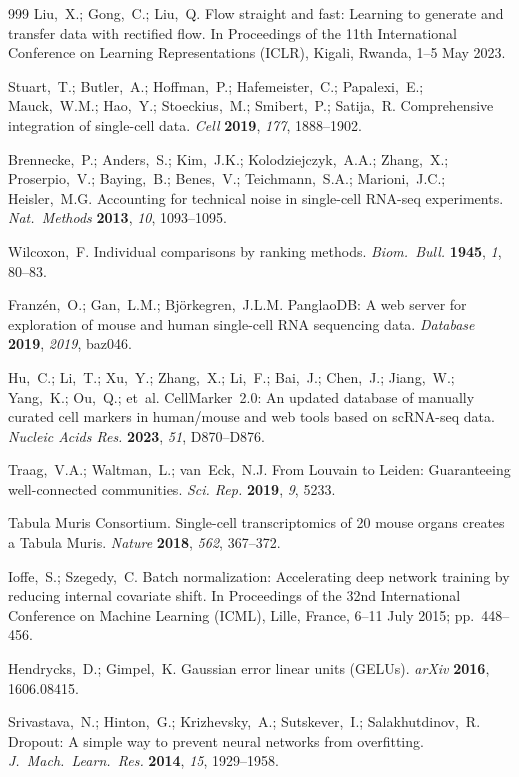 \documentclass[preprint,12pt]{elsarticle}
\begin{document}
\begin{thebibliography}{999}
Liu,~X.; Gong,~C.; Liu,~Q. Flow straight and fast: Learning to generate and transfer data with rectified flow. In Proceedings of the 11th International Conference on Learning Representations (ICLR), Kigali, Rwanda, 1--5 May 2023.

Stuart,~T.; Butler,~A.; Hoffman,~P.; Hafemeister,~C.; Papalexi,~E.; Mauck,~W.M.; Hao,~Y.; Stoeckius,~M.; Smibert,~P.; Satija,~R. Comprehensive integration of single-cell data. {\em Cell} {\bf 2019}, {\em 177}, 1888--1902.

Brennecke,~P.; Anders,~S.; Kim,~J.K.; Kolodziejczyk,~A.A.; Zhang,~X.; Proserpio,~V.; Baying,~B.; Benes,~V.; Teichmann,~S.A.; Marioni,~J.C.; Heisler,~M.G. Accounting for technical noise in single-cell RNA-seq experiments. {\em Nat.\ Methods} {\bf 2013}, {\em 10}, 1093--1095.

Wilcoxon,~F. Individual comparisons by ranking methods. {\em Biom.\ Bull.} {\bf 1945}, {\em 1}, 80--83.

Franz\'{e}n,~O.; Gan,~L.M.; Bj\"{o}rkegren,~J.L.M. PanglaoDB: A web server for exploration of mouse and human single-cell RNA sequencing data. {\em Database} {\bf 2019}, {\em 2019}, baz046.

Hu,~C.; Li,~T.; Xu,~Y.; Zhang,~X.; Li,~F.; Bai,~J.; Chen,~J.; Jiang,~W.; Yang,~K.; Ou,~Q.; et~al. CellMarker~2.0: An updated database of manually curated cell markers in human/mouse and web tools based on scRNA-seq data. {\em Nucleic Acids Res.} {\bf 2023}, {\em 51}, D870--D876.

Traag,~V.A.; Waltman,~L.; van~Eck,~N.J. From Louvain to Leiden: Guaranteeing well-connected communities. {\em Sci. Rep.} {\bf 2019}, {\em 9}, 5233.

Tabula Muris Consortium. Single-cell transcriptomics of 20 mouse organs creates a Tabula Muris. {\em Nature} {\bf 2018}, {\em 562}, 367--372.

Ioffe,~S.; Szegedy,~C. Batch normalization: Accelerating deep network training by reducing internal covariate shift. In Proceedings of the 32nd International Conference on Machine Learning (ICML), Lille, France, 6--11 July 2015; pp.\ 448--456.

Hendrycks,~D.; Gimpel,~K. Gaussian error linear units (GELUs). {\em arXiv} {\bf 2016}, 1606.08415.

Srivastava,~N.; Hinton,~G.; Krizhevsky,~A.; Sutskever,~I.; Salakhutdinov,~R. Dropout: A simple way to prevent neural networks from overfitting. {\em J.\ Mach.\ Learn.\ Res.} {\bf 2014}, {\em 15}, 1929--1958.


\end{thebibliography}
\end{document}
